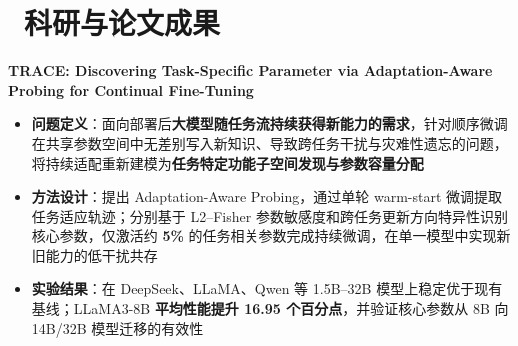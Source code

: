 \documentclass{resume}
\begin{document}
\section{\ 科研与论文成果}
\noindent
\textbf{TRACE: Discovering Task-Specific Parameter via Adaptation-Aware Probing for Continual Fine-Tuning}\par
{}
\begin{itemize}
  \item \textbf{问题定义}：面向部署后\textbf{大模型随任务流持续获得新能力的需求}，针对顺序微调在共享参数空间中无差别写入新知识、导致跨任务干扰与灾难性遗忘的问题，将持续适配重新建模为\textbf{任务特定功能子空间发现与参数容量分配}
  \item \textbf{方法设计}：提出 Adaptation-Aware Probing，通过单轮 warm-start 微调提取任务适应轨迹；分别基于 L2--Fisher 参数敏感度和跨任务更新方向特异性识别核心参数，仅激活约 \textbf{5\%} 的任务相关参数完成持续微调，在单一模型中实现新旧能力的低干扰共存
  \item \textbf{实验结果}：在 DeepSeek、LLaMA、Qwen 等 1.5B--32B 模型上稳定优于现有基线；LLaMA3-8B \textbf{平均性能提升 16.95 个百分点}，并验证核心参数从 8B 向 14B/32B 模型迁移的有效性
\end{itemize}

%
\end{document}
